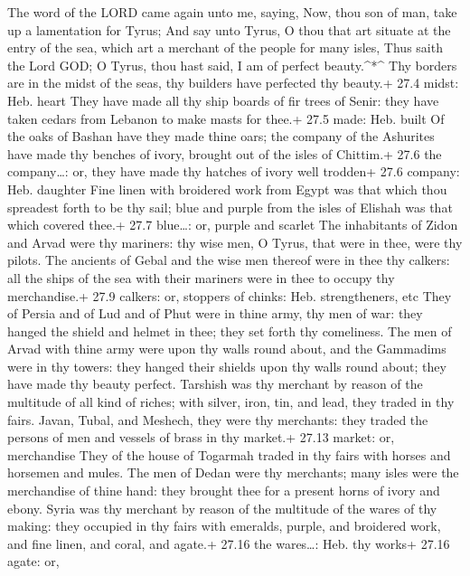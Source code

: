  The word of the LORD came again unto me, saying,
 Now, thou son of man, take up a lamentation for Tyrus;
 And say unto Tyrus, O thou that art situate at the entry of
the sea, which art a merchant of the people for many isles, Thus saith
the Lord GOD; O Tyrus, thou hast said, I am of perfect beauty.\^{}*\^{}
 Thy borders are in the midst of the seas, thy builders have
perfected thy beauty.+ 27.4 midst: Heb. heart  They have
made all thy ship boards of fir trees of Senir: they have taken cedars
from Lebanon to make masts for thee.+ 27.5 made: Heb. built 
Of the oaks of Bashan have they made thine oars; the company of the
Ashurites have made thy benches of ivory, brought out of the isles of
Chittim.+ 27.6 the company\ldots: or, they have made thy hatches of
ivory well trodden+ 27.6 company: Heb. daughter  Fine linen
with broidered work from Egypt was that which thou spreadest forth to be
thy sail; blue and purple from the isles of Elishah was that which
covered thee.+ 27.7 blue\ldots: or, purple and scarlet  The
inhabitants of Zidon and Arvad were thy mariners: thy wise men, O Tyrus,
that were in thee, were thy pilots.  The ancients of Gebal
and the wise men thereof were in thee thy calkers: all the ships of the
sea with their mariners were in thee to occupy thy merchandise.+ 27.9
calkers: or, stoppers of chinks: Heb. strengtheners, etc 
They of Persia and of Lud and of Phut were in thine army, thy men of
war: they hanged the shield and helmet in thee; they set forth thy
comeliness.  The men of Arvad with thine army were upon thy
walls round about, and the Gammadims were in thy towers: they hanged
their shields upon thy walls round about; they have made thy beauty
perfect.  Tarshish was thy merchant by reason of the
multitude of all kind of riches; with silver, iron, tin, and lead, they
traded in thy fairs.  Javan, Tubal, and Meshech, they were
thy merchants: they traded the persons of men and vessels of brass in
thy market.+ 27.13 market: or, merchandise  They of the
house of Togarmah traded in thy fairs with horses and horsemen and
mules.  The men of Dedan were thy merchants; many isles
were the merchandise of thine hand: they brought thee for a present
horns of ivory and ebony.  Syria was thy merchant by reason
of the multitude of the wares of thy making: they occupied in thy fairs
with emeralds, purple, and broidered work, and fine linen, and coral,
and agate.+ 27.16 the wares\ldots: Heb. thy works+ 27.16 agate: or,
